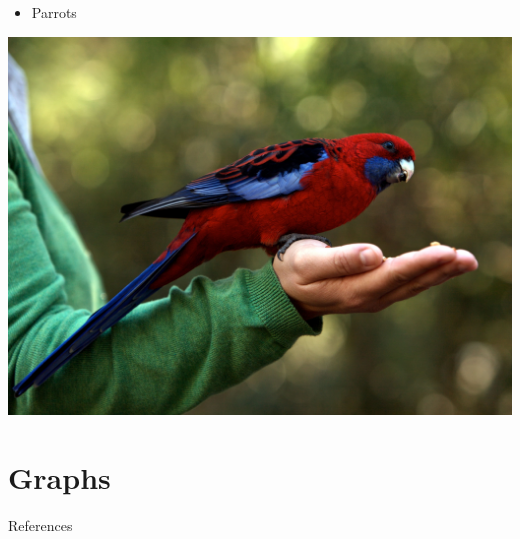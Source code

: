 \documentclass{beamer}\usepackage[]{graphicx}\usepackage[]{xcolor}
\begin{document}
\begin{frame}
\begin{itemize}
		\item Parrots
\end{itemize}
\includegraphics[scale=0.7]{parrots.png}

\end{frame}

\section{Graphs}






\begin{frame}[allowframebreaks]{References}
	
	
\end{frame}
\end{document}
